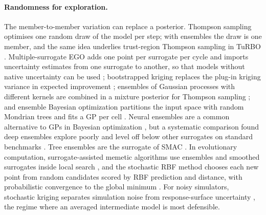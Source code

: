 \paragraph{Randomness for exploration.}
The member-to-member variation can replace a posterior. Thompson sampling optimises one random draw of the model per
step; with ensembles the draw is one member, and the same idea underlies trust-region Thompson sampling in TuRBO
\cite{eriksson2019scalable}. Multiple-surrogate EGO adds one point per surrogate per cycle and imports uncertainty
estimates from one surrogate to another, so that models without native uncertainty can be used
\cite{viana2013efficient}; bootstrapped kriging replaces the plug-in kriging variance in expected improvement
\cite{kleijnen2012expected}; ensembles of Gaussian processes with different kernels are combined in a mixture
posterior for Thompson sampling \cite{lu2022surrogate}; and ensemble Bayesian optimization partitions the input space
with random Mondrian trees and fits a GP per cell \cite{wang2018batched}. Neural ensembles are a common alternative to
GPs in Bayesian optimization \cite{springenberg2016bayesian}, but a systematic comparison found deep ensembles explore
poorly and level off below other surrogates on standard benchmarks \cite{li2024study}. Tree ensembles are the
surrogate of SMAC \cite{hutter2011sequential}. In evolutionary computation, surrogate-assisted memetic algorithms use
ensembles and smoothed surrogates inside local search \cite{lim2010generalizing,jin2011surrogate}, and the stochastic
RBF method chooses each new point from random candidates scored by RBF prediction and distance, with probabilistic
convergence to the global minimum \cite{regis2007stochastic}. For noisy simulators, stochastic kriging separates
simulation noise from response-surface uncertainty \cite{ankenman2010stochastic}, the regime where an averaged
intermediate model is most defensible.

